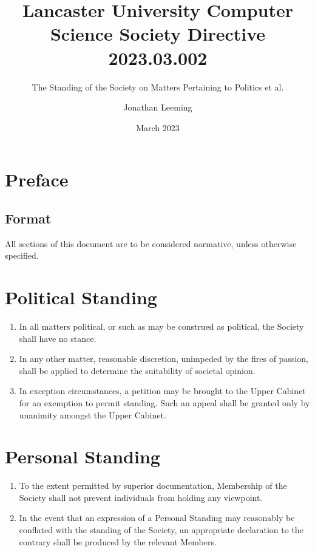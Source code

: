 \documentclass{scrartcl}
\title{Lancaster University Computer Science Society Directive 2023.03.002}
\subtitle{The Standing of the Society on Matters Pertaining to Politics et al.}
\author{Jonathan Leeming}
\date{March 2023}
\begin{document}
    \maketitle
    
    \clearpage
    \tableofcontents

    \clearpage
    \section{Preface}
        \label{preface}
        \subsection{Format}
            \label{preface--format}
            All sections of this document are to be considered normative, unless otherwise specified.

    \clearpage
    \section{Political Standing}
        \label{political-standing}
        \begin{enumerate}
            \item In all matters political, or such as may be construed as political, the Society shall have no stance.
            \item In any other matter, reasonable discretion, unimpeded by the fires of passion, shall be applied to determine the suitability of societal opinion.
            \item In exception circumstances, a petition may be brought to the Upper Cabinet for an exemption to permit standing.
                \subitem Such an appeal shall be granted only by unanimity amongst the Upper Cabinet.
        \end{enumerate}

    \clearpage
    \section{Personal Standing}
        \label{personal-standing}
        \begin{enumerate}
            \item To the extent permitted by superior documentation, Membership of the Society shall not prevent individuals from holding any viewpoint.
            \item In the event that an expression of a Personal Standing may reasonably be conflated with the standing of the Society, an appropriate declaration to the contrary shall be produced by the relevant Members.
        \end{enumerate}
\end{document}
